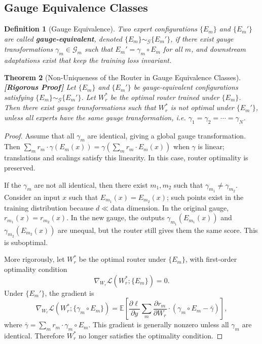 \documentclass[12pt,a4paper]{article}
\newtheorem{theorem}{Theorem}[section]
\newtheorem{definition}[theorem]{Definition}
\theoremstyle{remark}
\newcommand{\E}{\mathbb{E}}
\newcommand{\G}{\mathcal{G}}
\newcommand{\loss}{\mathcal{L}}
\newcommand{\rigorFull}{\textnormal{\textbf{[Rigorous Proof]}}}
\begin{document}
\subsection{Gauge Equivalence Classes}

\begin{definition}[Gauge Equivalence]\label{def:gauge_equiv}
Two expert configurations $\{E_m\}$ and $\{E_m'\}$ are called \textbf{gauge-equivalent}, denoted $\{E_m\} \sim_{\G} \{E_m'\}$, if there exist gauge transformations $\gamma_m \in \G_m$ such that $E_m' = \gamma_m \circ E_m$ for all $m$, and downstream adaptations exist that keep the training loss invariant.
\end{definition}

\begin{theorem}[Non-Uniqueness of the Router in Gauge Equivalence Classes]\label{thm:nonuniq}\rigorFull
Let $\{E_m\}$ and $\{E_m'\}$ be gauge-equivalent configurations satisfying $\{E_m\} \sim_{\G} \{E_m'\}$. Let $W_r^*$ be the optimal router trained under $\{E_m\}$. Then there exist gauge transformations such that $W_r^*$ is not optimal under $\{E_m'\}$, unless all experts have the same gauge transformation, i.e. $\gamma_1 = \gamma_2 = \cdots = \gamma_N$.
\end{theorem}

\begin{proof}
Assume that all $\gamma_m$ are identical, giving a global gauge transformation. Then $\sum_m r_m \cdot \gamma(E_m(x)) = \gamma(\sum_m r_m \cdot E_m(x))$ when $\gamma$ is linear; translations and scalings satisfy this linearity. In this case, router optimality is preserved.

If the $\gamma_m$ are not all identical, then there exist $m_1, m_2$ such that $\gamma_{m_1} \neq \gamma_{m_2}$. Consider an input $x$ such that $E_{m_1}(x) = E_{m_2}(x)$; such points exist in the training distribution because $d \ll \text{data dimension}$. In the original gauge, $r_{m_1}(x) = r_{m_2}(x)$. In the new gauge, the outputs $\gamma_{m_1}(E_{m_1}(x))$ and $\gamma_{m_2}(E_{m_2}(x))$ are unequal, but the router still gives them the same score. This is suboptimal.

More rigorously, let $W_r^*$ be the optimal router under $\{E_m\}$, with first-order optimality condition
\begin{equation}
    \nabla_{W_r} \loss(W_r^*; \{E_m\}) = 0.
\end{equation}
Under $\{E_m'\}$, the gradient is
\begin{equation}
    \nabla_{W_r} \loss(W_r^*; \{\gamma_m \circ E_m\}) = \E\left[ \frac{\partial \ell}{\partial y} \sum_m \frac{\partial r_m}{\partial W_r} \cdot (\gamma_m \circ E_m - \bar{\gamma}) \right],
\end{equation}
where $\bar{\gamma} = \sum_m r_m \cdot \gamma_m \circ E_m$. This gradient is generally nonzero unless all $\gamma_m$ are identical. Therefore $W_r^*$ no longer satisfies the optimality condition.
\end{proof}
\end{document}
